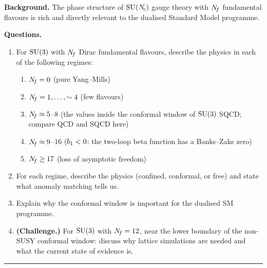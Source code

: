 \documentclass[11pt,a4paper]{article}
\begin{document}
\noindent\textbf{Background.}
The phase structure of $\mathrm{SU}(N_{\!c})$ gauge theory with $N_{\!f}$ fundamental
flavours is rich and directly relevant to the dualised Standard Model
programme.

\medskip
\noindent\textbf{Questions.}
\begin{enumerate}[label=(\alph*)]
  \item For $\mathrm{SU}(3)$ with $N_{\!f}$ Dirac fundamental flavours, describe the
    \IR{} physics in each of the following regimes:
    \begin{enumerate}[label=(\roman*)]
      \item $N_{\!f} = 0$ (pure Yang--Mills)
      \item $N_{\!f} = 1,\ldots,\sim 4$ (few flavours)
      \item $N_{\!f} \approx 5$--$8$ (the values inside the conformal window
        of $\mathrm{SU}(3)$ SQCD; compare QCD and SQCD here)
      \item $N_{\!f} \approx 9$--$16$ ($b_1 < 0$: the two-loop beta
        function has a Banks--Zaks zero)
      \item $N_{\!f} \geq 17$ (loss of asymptotic freedom)
    \end{enumerate}

  \item For each regime, describe the \IR{} physics (confined, conformal,
    or free) and state what anomaly matching tells us.

  \item Explain why the conformal window is important for the dualised SM
    programme.

  \item \textbf{(Challenge.)} For $\mathrm{SU}(3)$ with $N_{\!f} = 12$, near the lower
    boundary of the non-SUSY conformal window: discuss why lattice
    simulations are needed and what the current state of evidence is.
\end{enumerate}

\bigskip
\hrule
\bigskip
\end{document}
